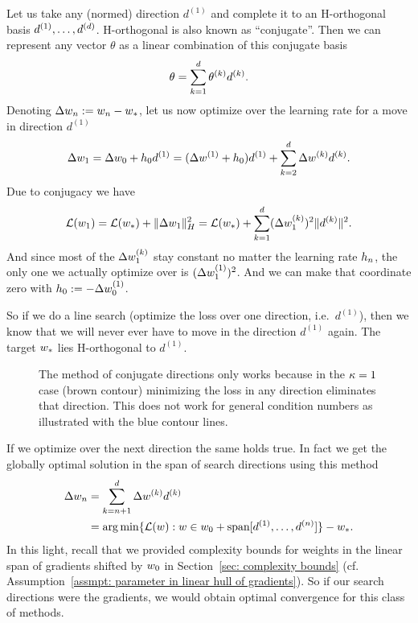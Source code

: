 Let us take any (normed) direction \(d^{(1)}\) and complete it to an H-orthogonal
basis \(d^{(1)},\dots,d^{(d)}\). H-orthogonal is also known as
``conjugate''. Then we can represent any vector \(\theta\) as a linear
combination of this conjugate basis
\begin{align*}
	\theta = \sum_{k=1}^d \theta^{(k)} d^{(k)}.
\end{align*}
Denoting \(\Delta w_n := w_n -w_*\), let us now optimize over
the learning rate for a move in direction \(d^{(1)}\)
\begin{align*}
	\Delta w_{1} = \Delta w_0 + h_0 d^{(1)}
	= (\Delta w^{(1)} + h_0)d^{(1)}
	+ \sum_{k=2}^d \Delta w^{(k)} d^{(k)}.
\end{align*}
Due to conjugacy we have
\begin{align*}
	\mathcal{L}(w_{1})
	= \mathcal{L}(w_*) + \|\Delta w_{1}\|_H^2
	= \mathcal{L}(w_*) + \sum_{k=1}^{d} (\Delta w_{1}^{(k)})^2\|d^{(k)}\|^2.
\end{align*}
And since most of the \(\Delta w^{(k)}_{1}\) stay constant no matter the
learning rate \(h_n\), the only one we actually optimize over is
\((\Delta w^{(1)}_{1})^2\).
And we can make that coordinate zero with \(h_0 :=-\Delta w_0^{(1)}\).

So if we do a line search (optimize the loss over one direction, i.e.\ \(d^{(1)}\)),
then we know that we will never ever have to move in the direction \(d^{(1)}\)
again. The target \(w_*\) lies H-orthogonal to \(d^{(1)}\).
%
\begin{figure}[h]
	\centering
	\def\svgwidth{1\textwidth}
	
	\caption{
		The method of conjugate directions only works because in the
		\(\kappa=1\) case (brown contour) minimizing the loss in any direction
		eliminates that direction. This does not work for general condition numbers
		as illustrated with the blue contour lines.
	}
	\label{fig: conjugate direction depends on condition one}
\end{figure}
%
If we optimize over the next direction the same holds true. In fact we get the
globally optimal solution in the span of search directions using this method 
\begin{align*}
	\Delta w_n &= \sum_{k=n+1}^d\Delta w^{(k)} d^{(k)}\\
	&= \arg\min \{
		\mathcal{L}(w) : w \in w_0 + \text{span}[d^{(1)},\dots, d^{(n)}]
	\} - w_*.
\end{align*}
In this light, recall that we provided complexity bounds for weights in the
linear span of gradients shifted by \(w_0\) in Section~\ref{sec: complexity bounds}
(cf. Assumption~\ref{assmpt: parameter in linear hull of gradients}). So if our
search directions were the gradients, we would obtain optimal convergence for
this class of methods.

